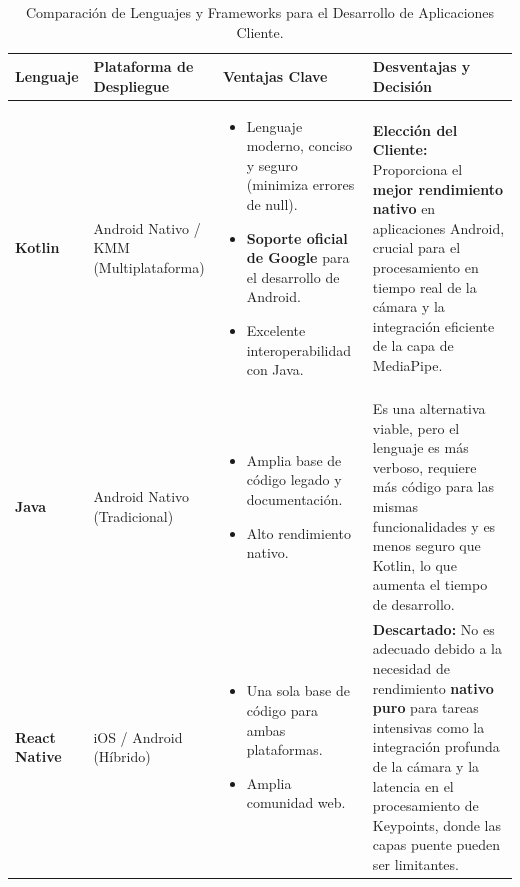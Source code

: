 \begin{table}[H]
    \centering
    \caption{Comparación de Lenguajes y Frameworks para el Desarrollo de Aplicaciones Cliente.}
    \label{tabla_comparativa_client_app}
    \begin{tabular}{|p{2.5cm}|p{3.5cm}|p{5cm}|p{5.5cm}|}
        \hline
        \textbf{Lenguaje} & \textbf{Plataforma de Despliegue} & \textbf{Ventajas Clave} & \textbf{Desventajas y Decisión} \\
        \hline
        \textbf{Kotlin} &
        Android Nativo / KMM (Multiplataforma) &
        \begin{itemize}[nosep, itemsep=0pt]
            \item Lenguaje moderno, conciso y seguro (minimiza errores de null).
            \item \textbf{Soporte oficial de Google} para el desarrollo de Android.
            \item Excelente interoperabilidad con Java.
        \end{itemize} &
        \textbf{Elección del Cliente:} Proporciona el \textbf{mejor rendimiento nativo} en aplicaciones Android, crucial para el procesamiento en tiempo real de la cámara y la integración eficiente de la capa de MediaPipe. \\
        \hline
        \textbf{Java} &
        Android Nativo (Tradicional) &
        \begin{itemize}[nosep, itemsep=0pt]
            \item Amplia base de código legado y documentación.
            \item Alto rendimiento nativo.
        \end{itemize} &
        Es una alternativa viable, pero el lenguaje es más verboso, requiere más código para las mismas funcionalidades y es menos seguro que Kotlin, lo que aumenta el tiempo de desarrollo. \\
        \hline
        \textbf{React Native} &
        iOS / Android (Híbrido) &
        \begin{itemize}[nosep, itemsep=0pt]
            \item Una sola base de código para ambas plataformas.
            \item Amplia comunidad web.
        \end{itemize} &
        \textbf{Descartado:} No es adecuado debido a la necesidad de rendimiento \textbf{nativo puro} para tareas intensivas como la integración profunda de la cámara y la latencia en el procesamiento de Keypoints, donde las capas puente pueden ser limitantes. \\
        \hline
    \end{tabular}
\end{table}

